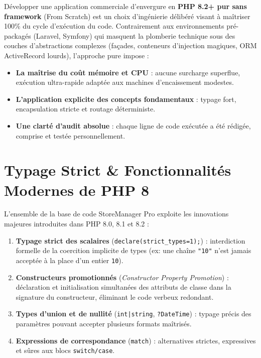 \documentclass[11pt,a4paper,titlepage,twoside,openright]{report}
\begin{document}
Développer une application commerciale d'envergure en \textbf{PHP 8.2+ pur sans framework} (From Scratch) est un choix d'ingénierie délibéré visant à maîtriser 100\% du cycle d'exécution du code. Contrairement aux environnements pré-packagés (Laravel, Symfony) qui masquent la plomberie technique sous des couches d'abstractions complexes (façades, conteneurs d'injection magiques, ORM ActiveRecord lourds), l'approche pure impose :
\begin{itemize}
    \item \textbf{La maîtrise du coût mémoire et CPU} : aucune surcharge superflue, exécution ultra-rapide adaptée aux machines d'encaissement modestes.
    \item \textbf{L'application explicite des concepts fondamentaux} : typage fort, encapsulation stricte et routage déterministe.
    \item \textbf{Une clarté d'audit absolue} : chaque ligne de code exécutée a été rédigée, comprise et testée personnellement.
\end{itemize}

\section{Typage Strict \& Fonctionnalités Modernes de PHP 8}

L'ensemble de la base de code StoreManager Pro exploite les innovations majeures introduites dans PHP 8.0, 8.1 et 8.2 :
\begin{enumerate}
    \item \textbf{Typage strict des scalaires} (\texttt{declare(strict\_types=1);}) : interdiction formelle de la coercition implicite de types (ex: une chaîne \texttt{"10"} n'est jamais acceptée à la place d'un entier \texttt{10}).
    \item \textbf{Constructeurs promotionnés} (\emph{Constructor Property Promotion}) : déclaration et initialisation simultanées des attributs de classe dans la signature du constructeur, éliminant le code verbeux redondant.
    \item \textbf{Types d'union et de nullité} (\texttt{int|string}, \texttt{?DateTime}) : typage précis des paramètres pouvant accepter plusieurs formats maîtrisés.
    \item \textbf{Expressions de correspondance} (\texttt{match}) : alternatives strictes, expressives et sûres aux blocs \texttt{switch/case}.
\end{enumerate}
\end{document}
